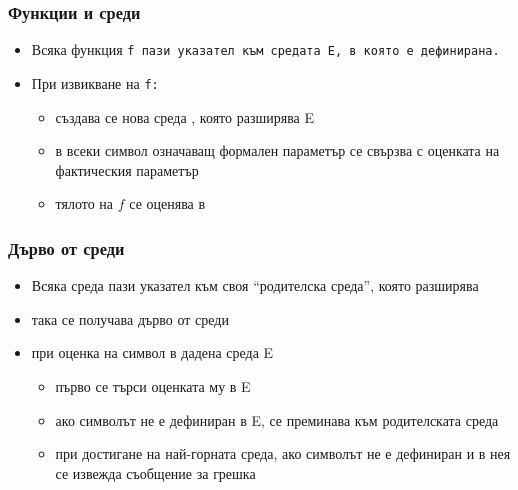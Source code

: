 \documentclass[alsotrans]{beamerswitch}
\begin{document}
\begin{frame}
  \frametitle{Функции и среди}

  \begin{itemize}[<+->]
  \item Всяка функция \tt f пази указател към средата \env E, в която е дефинирана.
  \item При извикване на \tt f:
    \begin{itemize}
    \item създава се нова среда , която разширява \env E
    \item в  всеки символ означаващ формален параметър се свързва с оценката на фактическия параметър
    \item тялото на $f$ се оценява в 
    \end{itemize}
  \end{itemize}
\end{frame}

\begin{frame}
  \frametitle{Дърво от среди}
  \begin{itemize}[<+->]
  \item Всяка среда пази указател към своя ``родителска среда'', която разширява
  \item така се получава дърво от среди
  \item при оценка на символ в дадена среда \env E
    \begin{itemize}
    \item първо се търси оценката му в \env E
    \item ако символът не е дефиниран в \env E, се преминава към родителската среда
    \item при достигане на най-горната среда, ако символът не е дефиниран и в нея се извежда съобщение за грешка
    \end{itemize}
  \end{itemize}
\end{frame}
\end{document}
